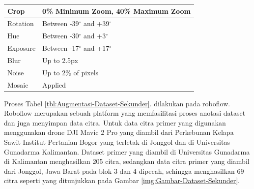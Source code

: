 \begin{enumerate}
\begin{singlespace}
\begin{table}[H]
\begin{tabular}{|p{4cm}|p{8cm}|}
				Crop       & 0\% Minimum Zoom, 40\% Maximum Zoom \\ \hline
				
				Rotation   & Between -39$^{\circ}$ and +39$^{\circ}$               \\ \hline
				Hue & Between -30$^{\circ}$ and +3$^{\circ}$\\ \hline
				
				Exposure & Between -17$^{\circ}$ and +17$^{\circ}$ \\ \hline
				
				Blur & Up to 2.5px \\ \hline
				
				Noise & Up to 2\% of pixels \\ \hline
				
				Mosaic & Applied \\ \hline
			\end{tabular}
		\end{table}
	\end{singlespace}
	
	Proses Tabel \ref{tbl:Augmentasi-Dataset-Sekunder}. dilakukan pada roboflow. Roboflow merupakan sebuah platform yang memfasilitasi proses anotasi dataset dan juga menyimpan data citra. Untuk data citra primer yang digunakan menggunakan drone DJI Mavic 2 Pro yang diambil dari Perkebunan Kelapa Sawit Institut Pertanian Bogor yang terletak di Jonggol dan di Universitas Gunadarma Kalimantan. Dataset primer yang diambil di Universitas Gunadarma di Kalimantan menghasilkan 205 citra, sedangkan data citra primer yang diambil dari Jonggol, Jawa Barat pada blok 3 dan 4 dipecah, sehingga menghasilkan 69 citra seperti yang ditunjukkan pada Gambar \ref{img:Gambar-Dataset-Sekunder}.
	

\end{enumerate}
